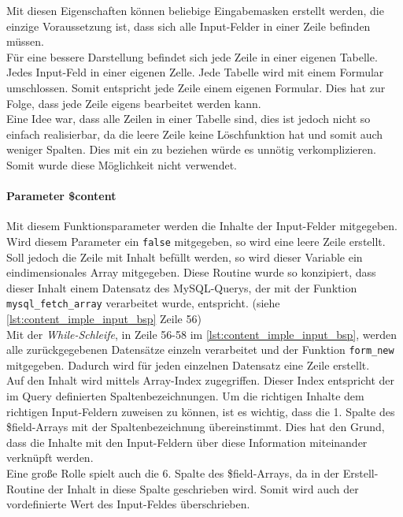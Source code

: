 Mit diesen Eigenschaften können beliebige Eingabemasken erstellt werden, die einzige Voraussetzung ist, dass sich alle Input-Felder in einer Zeile  befinden müssen.\\
Für eine bessere Darstellung befindet sich jede Zeile in einer eigenen Tabelle. Jedes Input-Feld in einer eigenen Zelle. Jede Tabelle wird mit einem Formular umschlossen. Somit entspricht jede Zeile einem eigenen Formular. Dies hat zur Folge, dass jede Zeile eigens bearbeitet werden kann.\\
Eine Idee war, dass alle Zeilen in einer Tabelle sind, dies ist jedoch nicht so einfach realisierbar, da die leere Zeile keine Löschfunktion hat und somit auch weniger Spalten. Dies mit ein zu beziehen würde es unnötig verkomplizieren. Somit wurde diese Möglichkeit nicht verwendet.
\paragraph{Parameter \$content\\}
Mit diesem Funktionsparameter werden die Inhalte der Input-Felder mitgegeben. Wird diesem Parameter ein \texttt{false} mitgegeben, so wird eine leere Zeile erstellt. Soll jedoch die Zeile mit Inhalt befüllt werden, so wird dieser Variable ein eindimensionales Array mitgegeben. Diese Routine wurde so konzipiert, dass dieser Inhalt einem Datensatz des MySQL-Querys, der mit der Funktion \texttt{mysql\_fetch\_array} verarbeitet wurde, entspricht. (siehe \autoref{lst:content_imple_input_bsp} Zeile 56)\\
Mit der \textit{While-Schleife}, in Zeile 56-58 im \autoref{lst:content_imple_input_bsp}, werden alle zurückgegebenen Datensätze einzeln verarbeitet und der Funktion \texttt{form\_new} mitgegeben. Dadurch wird für jeden einzelnen Datensatz eine Zeile erstellt.\\
Auf den Inhalt wird mittels Array-Index zugegriffen. Dieser Index entspricht der im Query definierten Spaltenbezeichnungen. Um die richtigen Inhalte dem richtigen Input-Feldern zuweisen zu können, ist es wichtig, dass die 1. Spalte des \$field-Arrays mit der Spaltenbezeichnung übereinstimmt. Dies hat den Grund, dass die Inhalte mit den Input-Feldern über diese Information miteinander verknüpft werden.\\
Eine große Rolle spielt auch die 6. Spalte des \$field-Arrays, da in der Erstell-Routine der Inhalt in diese Spalte geschrieben wird. Somit wird auch der vordefinierte Wert des Input-Feldes überschrieben.\\

